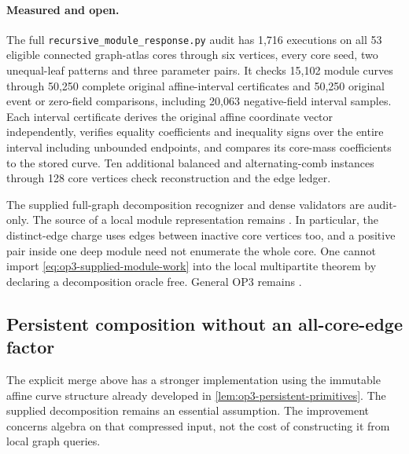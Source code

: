 \paragraph{Measured and open.}
The full \nolinkurl{recursive_module_response.py} audit has 1,716 executions
on all 53 eligible connected graph-atlas cores through six vertices, every
core seed, two unequal-leaf patterns and three parameter pairs. It checks
15,102 module curves through 50,250 complete original affine-interval
certificates and 50,250 original event or zero-field comparisons, including
20,063 negative-field interval samples. Each interval certificate derives
the original affine coordinate vector independently, verifies equality
coefficients and inequality signs over the entire interval including
unbounded endpoints, and compares its core-mass coefficients to the stored
curve. Ten additional balanced and alternating-comb instances through 128
core vertices check reconstruction and the edge ledger.

The supplied full-graph decomposition recognizer and dense validators are
audit-only. The source of a local module representation remains
\statusopen{}. In particular, the distinct-edge charge uses edges between
inactive core vertices too, and a positive pair inside one deep module need
not enumerate the whole core. One cannot import
\cref{eq:op3-supplied-module-work} into the local multipartite theorem by
declaring a decomposition oracle free. General OP3 remains \statusopen{}.

\subsection{Persistent composition without an all-core-edge factor}
\label{sec:op3-persistent-modules}

The explicit merge above has a stronger implementation using the immutable
affine curve structure already developed in
\cref{lem:op3-persistent-primitives}. The supplied decomposition remains an
essential assumption. The improvement concerns algebra on that compressed
input, not the cost of constructing it from local graph queries.

